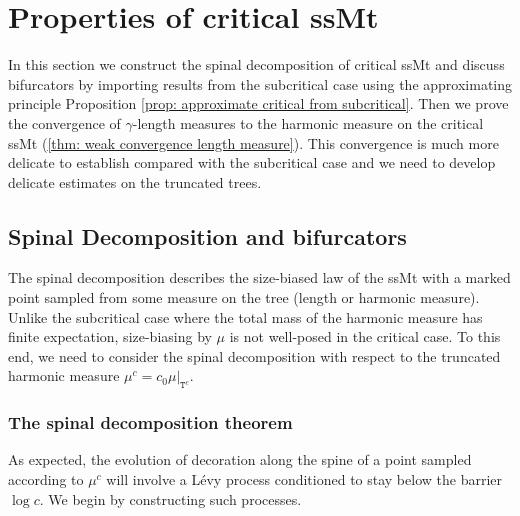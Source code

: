 \documentclass[12pt]{article}
\numberwithin{equation}{section}
\theoremstyle{plain}
\theoremstyle{definition}
\begin{document}




\section{Properties of critical ssMt}\label{sec: Properties ssMt}

In this section we construct the spinal decomposition of critical ssMt and discuss bifurcators by importing results from the subcritical case using the approximating principle Proposition \ref{prop: approximate critical from subcritical}. Then we prove the convergence of $\gamma$-length measures to the harmonic measure on the critical ssMt (\cref{thm: weak convergence length measure}). This convergence is much more delicate to establish compared with the subcritical case and we need to develop delicate estimates on the truncated trees.

\subsection{Spinal Decomposition and bifurcators}\label{sec: spinal decomposition}
The spinal decomposition describes the size-biased law of the ssMt  with a marked point sampled from some measure on the tree (length or harmonic measure). Unlike the subcritical case where the total mass of the harmonic measure has finite expectation, size-biasing by $\mu$ is not well-posed in the critical case. To this end, we need to consider the spinal decomposition with respect to the truncated harmonic measure $\mu^c = c_0\mu|_{\mathtt{T}^c}$.

\subsubsection{The spinal decomposition theorem}\label{sec: statement spinal decomposition}
As expected, the evolution of decoration along the spine of a point sampled according to $\mu^c$ will involve a  L\'evy process conditioned to stay below the barrier $\log c$. We begin by constructing such processes.

\bigskip
\end{document}
